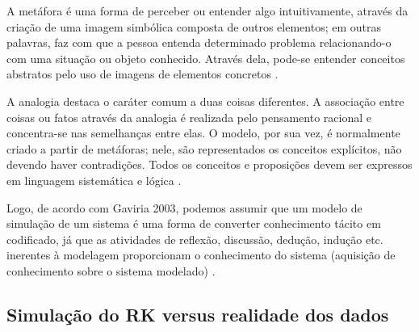 A metáfora é uma forma de perceber ou entender algo intuitivamente, através da criação de uma imagem simbólica composta de outros elementos; em outras palavras, faz com que a pessoa entenda determinado problema relacionando-o com uma situação ou objeto conhecido. Através dela, pode-se entender conceitos abstratos pelo uso de imagens de elementos concretos \cite{gavira2003simulaccao}.

A analogia destaca o caráter comum a duas coisas diferentes. A associação entre coisas ou fatos através da analogia é realizada pelo pensamento racional e concentra-se nas semelhanças entre elas. O modelo, por sua vez, é normalmente criado a partir de metáforas; nele, são representados os conceitos explícitos, não devendo haver contradições. Todos os conceitos e proposições devem ser expressos em linguagem sistemática e lógica \cite{gavira2003simulaccao}.

Logo, de acordo com Gaviria 2003, podemos assumir que um modelo de simulação de
um sistema é uma forma de converter conhecimento tácito em codificado, já que as
atividades de reflexão, discussão, dedução, indução etc. inerentes à modelagem
proporcionam o conhecimento do sistema (aquisição de conhecimento sobre o
sistema modelado) \cite{gavira2003simulaccao}.



\subsection{Simulação do RK versus realidade dos dados}



